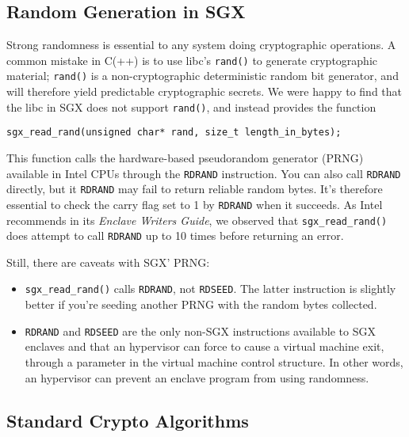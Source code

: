 \documentclass[]{article}
\begin{document}
\subsection{Random Generation in SGX}\label{random-generation-in-sgx}

Strong randomness is essential to any system doing cryptographic
operations. A common mistake in C(++) is to use libc's \texttt{rand()}
to generate cryptographic material; \texttt{rand()} is a
non-cryptographic deterministic random bit generator, and will therefore
yield predictable cryptographic secrets. We were happy to find that the
libc in SGX does not support \texttt{rand()}, and instead provides the
function

\begin{verbatim}
sgx_read_rand(unsigned char* rand, size_t length_in_bytes);
\end{verbatim}

This function calls the hardware-based pseudorandom generator (PRNG)
available in Intel CPUs through the \texttt{RDRAND} instruction. You can
also call \texttt{RDRAND} directly, but it \texttt{RDRAND} may fail to
return reliable random bytes. It's therefore essential to check the
carry flag set to 1 by \texttt{RDRAND} when it succeeds. As Intel
recommends in its \emph{Enclave Writers Guide}, we observed that
\texttt{sgx\_read\_rand()} does attempt to call \texttt{RDRAND} up to 10
times before returning an error.

Still, there are caveats with SGX' PRNG:

\begin{itemize}
\item
  \texttt{sgx\_read\_rand()} calls \texttt{RDRAND}, not \texttt{RDSEED}.
  The latter instruction is slightly better if you're seeding another
  PRNG with the random bytes collected.
\item
  \texttt{RDRAND} and \texttt{RDSEED} are the only non-SGX instructions
  available to SGX enclaves and that an hypervisor can force to cause a
  virtual machine exit, through a parameter in the virtual machine
  control structure. In other words, an hypervisor can prevent an
  enclave program from using randomness.
\end{itemize}

\subsection{Standard Crypto
Algorithms}\label{standard-crypto-algorithms}
\end{document}
